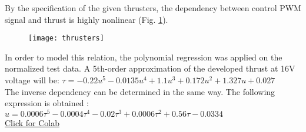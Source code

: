 By the specification of the given thrusters, the dependency between control 
PWM signal and thrust is highly nonlinear
(Fig. \ref{image:thrust}).\\
\begin{figure}[H]
    \centering\texttt{[image: thrusters]}
    \caption{}
    \label{image:thrust}
\end{figure}
In order to model this relation, the polynomial regression was applied on the normalized test data. 
A 5th-order approximation of the developed thrust at 16V voltage will be:
$
\tau = - 0.22 u^5
- 0.0135 u^4
+ 1.1 u^3
+ 0.172 u^2
+ 1.327 u 
+ 0.027
$\\
The inverse dependency can be determined in the same way. 
The following expression is obtained :
$
u = 0.0006 \tau^5 
- 0.0004 \tau^4 
- 0.02 \tau^3
+ 0.0006 \tau^2 
+ 0.56 \tau
-0.0334
$\\
\href{https://colab.research.google.com/drive/1XaNNENZPk88yaddOYy01vXtHd8_YwT2m?usp=sharing}{Click for Colab}